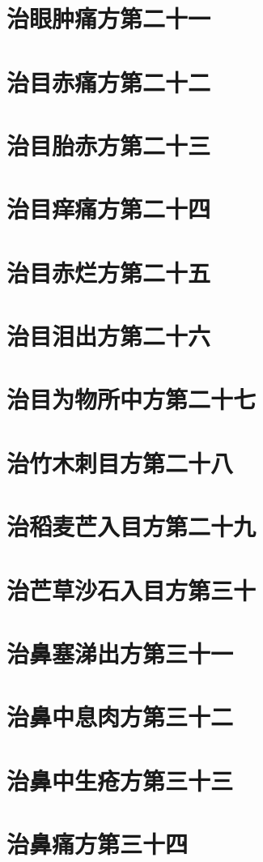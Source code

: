 \documentclass[a4paper,12pt,UTF8,twoside]{ctexbook}
\begin{document}
\chapter{治眼肿痛方第二十一}
\chapter{治目赤痛方第二十二}
\chapter{治目胎赤方第二十三}
\chapter{治目痒痛方第二十四}
\chapter{治目赤烂方第二十五}
\chapter{治目泪出方第二十六}
\chapter{治目为物所中方第二十七}
\chapter{治竹木刺目方第二十八}
\chapter{治稻麦芒入目方第二十九}
\chapter{治芒草沙石入目方第三十}
\chapter{治鼻塞涕出方第三十一}
\chapter{治鼻中息肉方第三十二}
\chapter{治鼻中生疮方第三十三}
\chapter{治鼻痛方第三十四}
\end{document}
